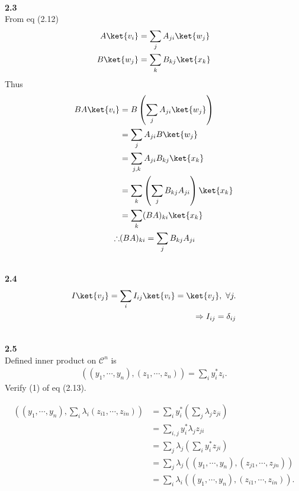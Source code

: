 \documentclass[10pt]{book}
\newcommand{\Textbf}[1]{\hspace{3mm}\\ \textbf{#1}\\}
\begin{document}
	
	\Textbf{2.3}
	
	From eq (2.12)
	\begin{equation}
\begin{aligned}
		A \ket{v_i} &= \sum_{j} A_{ji}\ket{w_j}\\
		B \ket{w_j} &= \sum_{k} B_{kj}\ket{x_k}
	\end{aligned}
\end{equation}
	Thus
	\begin{equation}
\begin{aligned}
		BA \ket{v_i} &= B \left( \sum_{j} A_{ji}\ket{w_j} \right)\\
		&= \sum_{j} A_{ji} B\ket{w_j}\\
		&= \sum_{j,k} A_{ji} B_{kj}\ket{x_k}\\
		&= \sum_k \left( \sum_j B_{kj} A_{ji}  \right) \ket{x_k}\\
		&= \sum_k (BA)_{ki} \ket{x_k}\\
		\therefore& (BA)_{ki} = \sum_j B_{kj} A_{ji}
	\end{aligned}
\end{equation}
	
	
	
	\Textbf{2.4}
	\begin{equation}
\begin{aligned}
		I\ket{v_j} = \sum_i I_{ij} \ket{v_i} = \ket{v_j},\ \forall j.\\
		\Rightarrow I_{ij} = \delta_{ij}
	\end{aligned}
\end{equation}
	
	
	\Textbf{2.5}
	
	Defined inner product on $\mathcal{C}^n$ is
	\begin{equation}
\begin{aligned}
		\left(
		(y_1, \cdots, y_n), (z_1, \cdots, z_n)
		\right)
		= \sum_{i} y_i^* z_i .
	\end{aligned}
\end{equation}
	Verify (1) of eq (2.13).
	
	\begin{equation}
\begin{aligned}
		\left(
		(y_1, \cdots, y_n), \sum_i \lambda_i (z_{i1}, \cdots, z_{in})
		\right)
		&= \sum_i y_i^* \left(
		\sum_j \lambda_j z_{ji}
		\right)\\
		&= \sum_{i,j} y_i^* \lambda_j z_{ji}\\
		&= \sum_j \lambda_j \left(\sum_i y_i^* z_{ji}  \right)\\
		&= \sum_j \lambda_j \left(
		(y_1, \cdots, y_n),  (z_{j1}, \cdots, z_{jn})
		\right)\\
		&= \sum_i \lambda_i \left(
		(y_1, \cdots, y_n),  (z_{i1}, \cdots, z_{in})
		\right).
	\end{aligned}
\end{equation}
	
\end{document}

